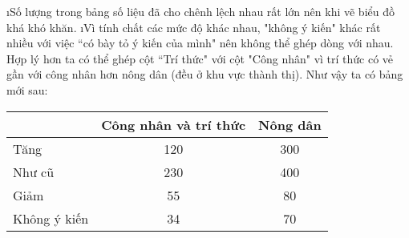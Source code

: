 \begin{Answer}{10}
		\begin{enumerate}[a),leftmargin=*]
			\i Số lượng trong bảng số liệu đã cho chênh lệch nhau rất lớn nên khi vẽ biểu đồ khá khó khăn.
			\i Vì tính chất các mức độ khác nhau, "không ý kiến" khác rất nhiều với việc  ``có bày tỏ ý kiến của mình" nên không thể ghép dòng với nhau. Hợp lý hơn ta có thể ghép cột  ``Trí thức" với cột "Công nhân" vì trí thức có vẻ gần với công nhân hơn nông dân (đều ở khu vực thành thị). Như vậy ta có bảng mới sau:
			\begin{center}
				\begin{tabular}{|l|c|c|}
					\hline
					&Công nhân và trí thức&	Nông dân\\
					\hline
					Tăng&	120&	300\\
					\hline
					Như cũ&	230&	400\\
					\hline
					Giảm&	55&	80\\
					\hline
					Không ý kiến&	34&	70\\
					\hline
				\end{tabular}
			\end{center}
		\end{enumerate}
	
\end{Answer}
